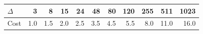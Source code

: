 \begin{tabular}{@{}lrrrrrrrrrr@{}}
\toprule
$\Delta$ & 3 & 8 & 15 & 24 & 48 & 80 & 120 & 255 & 511 & 1023 \\
\midrule
Cost & 1.0 & 1.5 & 2.0 & 2.5 & 3.5 & 4.5 & 5.5 & 8.0 & 11.0 & 16.0 \\
\bottomrule
\end{tabular}
